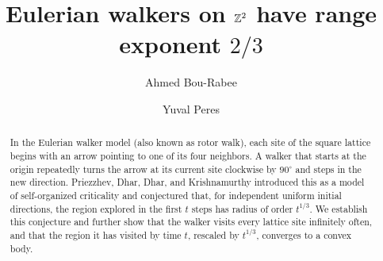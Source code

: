 \documentclass[11pt]{amsart}
\title{Eulerian walkers on $\mathbb Z^2$ have range exponent $2/3$}
\author{Ahmed Bou-Rabee}
\author{Yuval Peres}
\theoremstyle{plain}
\theoremstyle{definition}
\begin{document}
	
	\begin{abstract}
		In the Eulerian walker model (also known as rotor walk), each site of the
		square lattice begins with an arrow pointing to one of its four neighbors.  A
		walker that starts at the origin repeatedly turns the arrow at its current
		site clockwise by $90^\circ$ and steps in the new direction.
		Priezzhev, Dhar, Dhar, and Krishnamurthy
		\citeyearpar{PriezzhevDharDharKrishnamurthy1996} introduced this as a model of
		self-organized criticality and conjectured that, for independent uniform
		initial directions, the region explored in the first $t$ steps has radius of
		order $t^{1/3}$.  We establish this conjecture and further show that the walker visits every lattice site
		infinitely often, and that the region it has visited by time $t$, rescaled by
		$t^{1/3}$, converges to a convex body.
	\end{abstract}
	
	\maketitle
	
\end{document}
